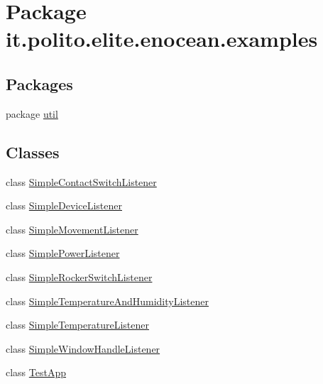 \hypertarget{namespaceit_1_1polito_1_1elite_1_1enocean_1_1examples}{}\section{Package it.\+polito.\+elite.\+enocean.\+examples}
\label{namespaceit_1_1polito_1_1elite_1_1enocean_1_1examples}
\subsection*{Packages}
\begin{DoxyCompactItemize}
\item 
package \hyperlink{namespaceit_1_1polito_1_1elite_1_1enocean_1_1examples_1_1util}{util}
\end{DoxyCompactItemize}
\subsection*{Classes}
\begin{DoxyCompactItemize}
\item 
class \hyperlink{classit_1_1polito_1_1elite_1_1enocean_1_1examples_1_1_simple_contact_switch_listener}{Simple\+Contact\+Switch\+Listener}
\item 
class \hyperlink{classit_1_1polito_1_1elite_1_1enocean_1_1examples_1_1_simple_device_listener}{Simple\+Device\+Listener}
\item 
class \hyperlink{classit_1_1polito_1_1elite_1_1enocean_1_1examples_1_1_simple_movement_listener}{Simple\+Movement\+Listener}
\item 
class \hyperlink{classit_1_1polito_1_1elite_1_1enocean_1_1examples_1_1_simple_power_listener}{Simple\+Power\+Listener}
\item 
class \hyperlink{classit_1_1polito_1_1elite_1_1enocean_1_1examples_1_1_simple_rocker_switch_listener}{Simple\+Rocker\+Switch\+Listener}
\item 
class \hyperlink{classit_1_1polito_1_1elite_1_1enocean_1_1examples_1_1_simple_temperature_and_humidity_listener}{Simple\+Temperature\+And\+Humidity\+Listener}
\item 
class \hyperlink{classit_1_1polito_1_1elite_1_1enocean_1_1examples_1_1_simple_temperature_listener}{Simple\+Temperature\+Listener}
\item 
class \hyperlink{classit_1_1polito_1_1elite_1_1enocean_1_1examples_1_1_simple_window_handle_listener}{Simple\+Window\+Handle\+Listener}
\item 
class \hyperlink{classit_1_1polito_1_1elite_1_1enocean_1_1examples_1_1_test_app}{Test\+App}
\end{DoxyCompactItemize}
